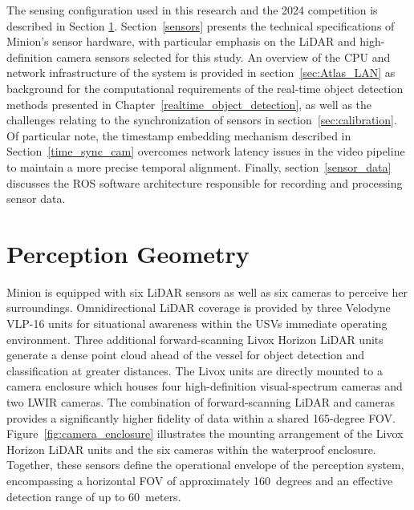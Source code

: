 \documentclass{erauthesis}
\begin{document}
The sensing configuration used in this research and the 2024 competition is described in Section \ref{perception_geometry}.
Section~\ref{sensors} presents the technical specifications of Minion's sensor hardware, with particular emphasis on the \ac{LiDAR} and high-definition camera sensors selected for this study.
An overview of the CPU and network infrastructure of the system is provided in section~\ref{sec:Atlas_LAN} as background for the computational requirements of the real-time object detection methods presented in Chapter~\ref{realtime_object_detection}, as well as the challenges relating to the synchronization of sensors in section~\ref{sec:calibration}.
Of particular note, the timestamp embedding mechanism described in Section~\ref{time_sync_cam} overcomes network latency issues in the video pipeline to maintain a more precise temporal alignment.
Finally, section~\ref{sensor_data} discusses the \ac{ROS} software architecture responsible for recording and processing sensor data.

\section{Perception Geometry} \label{perception_geometry}

Minion is equipped with six \ac{LiDAR} sensors as well as six cameras to perceive her surroundings.
Omnidirectional \ac{LiDAR} coverage is provided by three Velodyne VLP-16 units for situational awareness within the \acp{USV} immediate operating environment.
Three additional forward-scanning Livox Horizon \ac{LiDAR} units generate a dense point cloud ahead of the vessel for object detection and classification at greater distances.
The Livox units are directly mounted to a camera enclosure which houses four high-definition visual-spectrum cameras and two \ac{LWIR} cameras.
The combination of forward-scanning LiDAR and cameras provides a significantly higher fidelity of data within a shared 165-degree \ac{FOV}. %
Figure~\ref{fig:camera_enclosure} illustrates the mounting arrangement of the Livox Horizon LiDAR units and the six cameras within the waterproof enclosure.
Together, these sensors define the operational envelope of the perception system, encompassing a horizontal \ac{FOV} of approximately 160~degrees and an effective detection range of up to 60~meters.
\end{document}
